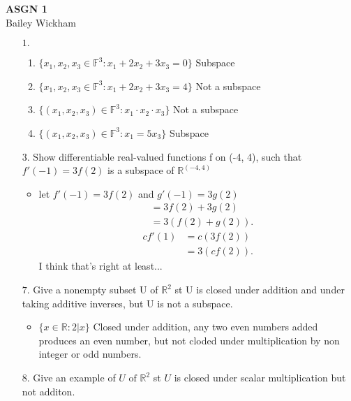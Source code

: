 \documentclass[a4paper]{article}
\begin{document}
\begin{center}
    {\LARGE \bf ASGN 1\\}
    {\large Bailey Wickham}
\end{center}

\begin{enumerate}

    \item[$1.$]  \begin{enumerate}
    \item $\{x_{1}, x_{2}, x_{3} \in  \mathbb{F}^3: x_{1} + 2x_{2} + 3x_{3} = 0\}$ Subspace
    \item $\{x_{1}, x_{2}, x_{3} \in  \mathbb{F}^3: x_{1} + 2x_{2} + 3x_{3} = 4\}$ Not a subspace
    \item $\{(x_{1}, x_{2}, x_{3}) \in \mathbb{F}^3 : x_{1} \cdot x_{2} \cdot x_{3}\}  $  Not a subspace
    \item $\{(x_{1}, x_{2}, x_{3}) \in \mathbb{F}^3 : x_{1} = 5x_{3}\}  $ Subspace
    \end{enumerate}
\item[$3.$]  Show differentiable real-valued functions f on (-4, 4), such that \\$f'(-1) = 3f(2)$ is a subspace of $\mathbb{R}^{(-4,4)}$  
    \begin{itemize}
        \item let $f'(-1) = 3f(2) $ and $g'(-1) = 3g(2)$ 
            \begin{align*}
                &= 3f(2) + 3g(2) \\
                &= 3(f(2) + g(2)) 
            .\end{align*}
            \begin{align*}
                cf'(1) &= c(3f(2)) \\
                &= 3(cf(2)) 
            .\end{align*}
            I think that's right at least...
    \end{itemize}
\item[$7.$] Give a nonempty subset U of $\mathbb{R}^2$ st U is closed under addition and under taking additive inverses, but U is not a subspace.
    \begin{itemize}
        \item $\{x \in \mathbb{R} : 2 | x\}  $ Closed under addition, any two even numbers added produces an even number, but not cloded under multiplication by non integer or odd numbers.
    \end{itemize}
        \item[$8.$]  Give an example of $U \text{ of } \mathbb{R}^2$ st $U$ is closed under scalar multiplication but not additon. 

\end{enumerate}
\end{document}
